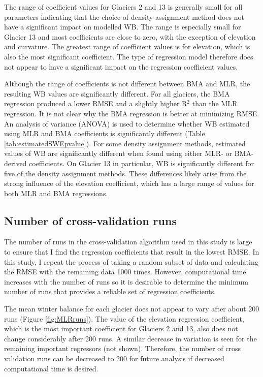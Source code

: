\documentclass{sfuthesis}
\begin{document}
The range of coefficient values for Glaciers 2 and 13 is generally small for all parameters indicating that the choice of density assignment method does not have a significant impact on modelled WB. The range is especially small for Glacier 13 and most coefficients are close to zero, with the exception of elevation and curvature. The greatest range of coefficient values is for elevation, which is also the most significant coefficient. The type of regression model therefore does not appear to have a significant impact on the regression coefficient values.

Although the range of coefficients is not different between BMA and MLR, the resulting WB values are significantly different. For all glaciers, the BMA regression produced a lower RMSE and a slightly higher R$^2$ than the MLR regression. It is not clear why the BMA regression is better at minimizing RMSE. An analysis of variance (ANOVA) is used to determine whether WB estimated using MLR and BMA coefficients is significantly different (Table \ref{tab:estimatedSWEpvalue}). For some density assignment methods, estimated values of WB are significantly different when found using either MLR- or BMA-derived coefficients. On Glacier 13 in particular, WB is significantly different for five of the density assignment methods. These differences likely arise from the strong influence of the elevation coefficient, which has a large range of values for both MLR and BMA regressions. 

\subsection{Number of cross-validation runs}

The number of runs in the cross-validation algorithm used in this study is large to ensure that I find the regression coefficients that result in the lowest RMSE. In this study, I repeat the process of taking a random subset of data and calculating the RMSE with the remaining data 1000 times.  However, computational time increases with the number of runs so it is desirable to determine the minimum number of runs that provides a reliable set of regression coefficients. 

The mean winter balance for each glacier does not appear to vary after about 200 runs (Figure \ref{fig:MLRruns}). The value of the elevation regression coefficient, which is the most important coefficient for Glaciers 2 and 13, also does not change considerably after 200 runs. A similar decrease in variation is seen for the remaining important regressors (not shown). Therefore, the number of cross validation runs can be decreased to 200 for future analysis if decreased computational time is desired. 
\end{document}
